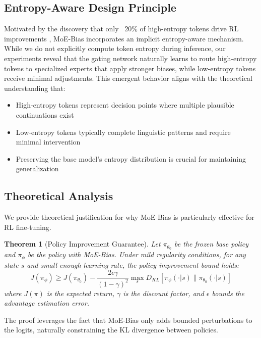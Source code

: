 \documentclass{article}
\newtheorem{theorem}{Theorem}
\begin{document}
\subsection{Entropy-Aware Design Principle}

Motivated by the discovery that only ~20\% of high-entropy tokens drive RL improvements \citep{wang2025highentropy}, MoE-Bias incorporates an implicit entropy-aware mechanism. While we do not explicitly compute token entropy during inference, our experiments reveal that the gating network naturally learns to route high-entropy tokens to specialized experts that apply stronger biases, while low-entropy tokens receive minimal adjustments. This emergent behavior aligns with the theoretical understanding that:

\begin{itemize}
    \item High-entropy tokens represent decision points where multiple plausible continuations exist
    \item Low-entropy tokens typically complete linguistic patterns and require minimal intervention
    \item Preserving the base model's entropy distribution is crucial for maintaining generalization
\end{itemize}

\subsection{Theoretical Analysis}

We provide theoretical justification for why MoE-Bias is particularly effective for RL fine-tuning.

\begin{theorem}[Policy Improvement Guarantee]
\label{thm:policy_improvement}
Let $\pi_{\theta_0}$ be the frozen base policy and $\pi_\phi$ be the policy with MoE-Bias. Under mild regularity conditions, for any state $s$ and small enough learning rate, the policy improvement bound holds:
\begin{equation}
    J(\pi_\phi) \geq J(\pi_{\theta_0}) - \frac{2\epsilon\gamma}{(1-\gamma)^2} \max_s D_{KL}[\pi_\phi(\cdot|s) \| \pi_{\theta_0}(\cdot|s)]
\end{equation}
where $J(\pi)$ is the expected return, $\gamma$ is the discount factor, and $\epsilon$ bounds the advantage estimation error.
\end{theorem}

The proof leverages the fact that MoE-Bias only adds bounded perturbations to the logits, naturally constraining the KL divergence between policies.
\end{document}
